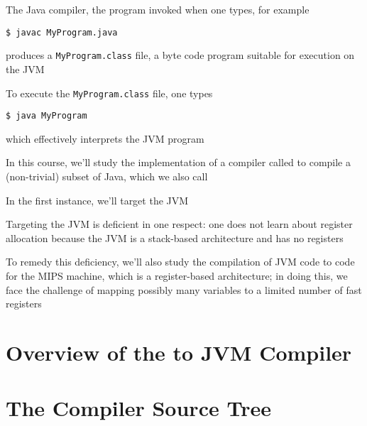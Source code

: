 \documentclass[8pt,a4paper,compress]{beamer}
\begin{document}
\begin{frame}[fragile]
\pause

The Java compiler, the program invoked when one types, for example
\begin{lstlisting}[language={}]
$ javac MyProgram.java
\end{lstlisting}
produces a \lstinline{MyProgram.class} file, a byte code program suitable for execution on the JVM

\pause
\bigskip

To execute the \lstinline{MyProgram.class} file, one types
\begin{lstlisting}[language={}]
$ java MyProgram
\end{lstlisting}
which effectively interprets the JVM program

\pause
\bigskip

In this course, we'll study the implementation of a compiler called \jmm to compile a (non-trivial) subset of Java, which we also call \jmm

\pause
\bigskip

In the first instance, we'll target the JVM

\pause
\bigskip

Targeting the JVM is deficient in one respect: one does not learn about register allocation because the JVM is a stack-based architecture and has no registers

\pause
\bigskip

To remedy this deficiency, we'll also study the compilation of JVM code to code for the MIPS machine, which is a register-based architecture; in doing this, we face the challenge of mapping possibly many variables to a limited number of fast registers
\end{frame}

\section{Overview of the \protect \jmm to JVM Compiler}
\begin{frame}[fragile]
\pause


\end{frame}

\section{The \protect \jmm Compiler Source Tree}
\begin{frame}[fragile]
\pause


\end{frame}
\end{document}

